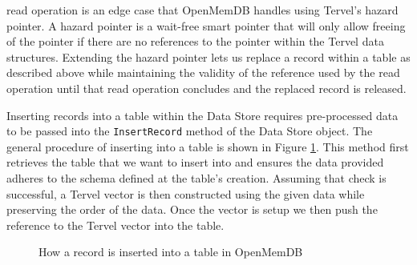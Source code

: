 \documentclass[conference, compsoc]{IEEEtran}
\let\oldReturn\Return
\renewcommand{\Return}{\State\oldReturn}
\newcommand{\inlinecode}[1]{\colorbox{codegrey}{\lstinline[language=C++]{#1}}}
\begin{document}
read operation is an edge case that OpenMemDB handles using Tervel's hazard pointer. A 
hazard pointer is a wait-free smart pointer that will only allow freeing of the pointer 
if there are no references to the pointer within the Tervel data structures. Extending 
the hazard pointer lets us replace a record within a table as described above while 
maintaining the validity of the reference used by the read operation until that read 
operation concludes and the replaced record is released.
\par\vspace{\baselineskip}
Inserting records into a table within the Data Store requires pre-processed data to be passed
into the \inlinecode{InsertRecord} method of the Data Store object. The general procedure of inserting
into a table is shown in Figure \ref{insert_record}. This method first retrieves the table 
that we want to insert into and ensures the data provided adheres to the schema defined 
at the table's creation. Assuming that check is successful, a Tervel vector is then 
constructed using the given data while preserving the order of the data. Once the vector 
is setup we then push the reference to the Tervel vector into the table.

\begin{figure}
 \begin{algorithmic}
 \EndIf
  \State{}
 \EndFor
 \State{}
 \EndFunction
 \end{algorithmic}
 \caption{How a record is inserted into a table in OpenMemDB}
 \label{insert_record}
\end{figure}
\end{document}
